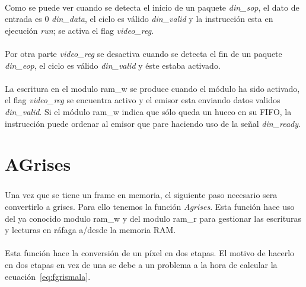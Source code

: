 \documentclass[a4paper,12pt,titlepage,final]{book}
\begin{document}
\paragraph{}
Como se puede ver cuando se detecta el inicio de un paquete \textit{din\_sop}, el dato de entrada es 0 \textit{din\_data}, el ciclo es válido \textit{din\_valid} y la instrucción esta en ejecución \textit{run}; se activa el flag \textit{video\_reg}.

\paragraph{}
Por otra parte \textit{video\_reg} se desactiva cuando se detecta el fin de un paquete \textit{din\_eop}, el ciclo es válido \textit{din\_valid} y éste estaba activado.



\paragraph{}
La escritura en el modulo ram\_w se produce cuando el módulo ha sido activado, el flag \textit{video\_reg} se encuentra activo y el emisor esta enviando datos validos \textit{din\_valid}. Si el módulo ram\_w indica que sólo queda un hueco en su FIFO, la instrucción puede ordenar al emisor que pare haciendo uso de la señal \textit{din\_ready}. 

\section{AGrises}
\subsubsection*{}
\paragraph{}
Una vez que se tiene un frame en memoria, el siguiente paso necesario sera convertirlo a grises. Para ello tenemos la función \textit{Agrises}. Esta función hace uso del ya conocido modulo ram\_w y del modulo ram\_r para gestionar las escrituras y lecturas en ráfaga a/desde la memoria RAM.

\paragraph{}
Esta función hace la conversión de un píxel en dos etapas. El motivo de hacerlo en dos etapas en vez de una se debe a un problema a la hora de calcular la ecuación~\ref{eq:fgrismala}.
\end{document}
